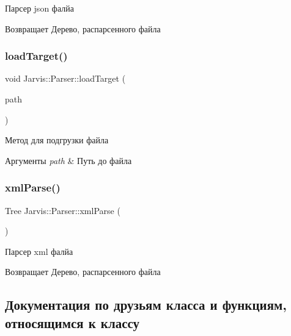 Парсер json фалйа 

\begin{DoxyReturn}{Возвращает}
Дерево, распарсенного файла 
\end{DoxyReturn}
\mbox{\label{classJarvis_1_1Parser_ae2e8ce2a61c865342619fffe478dcda3}} 
\subsubsection{\texorpdfstring{load\+Target()}{loadTarget()}}
{\footnotesize\ttfamily void Jarvis\+::\+Parser\+::load\+Target (\begin{DoxyParamCaption}\item[{const Path \&}]{path }\end{DoxyParamCaption})}



Метод для подгрузки файла 


\begin{DoxyParams}{Аргументы}
{\em path} & Путь до файла \\
\hline
\end{DoxyParams}
\mbox{\label{classJarvis_1_1Parser_ae970d807833a09eb01ac2bb3367560b7}} 
\subsubsection{\texorpdfstring{xml\+Parse()}{xmlParse()}}
{\footnotesize\ttfamily Tree Jarvis\+::\+Parser\+::xml\+Parse (\begin{DoxyParamCaption}{ }\end{DoxyParamCaption})}



Парсер xml фалйа 

\begin{DoxyReturn}{Возвращает}
Дерево, распарсенного файла 
\end{DoxyReturn}


\subsection{Документация по друзьям класса и функциям, относящимся к классу}
\mbox{\label{classJarvis_1_1Parser_ac52ba088bbd034ec108efce6c8f48e17}} 

